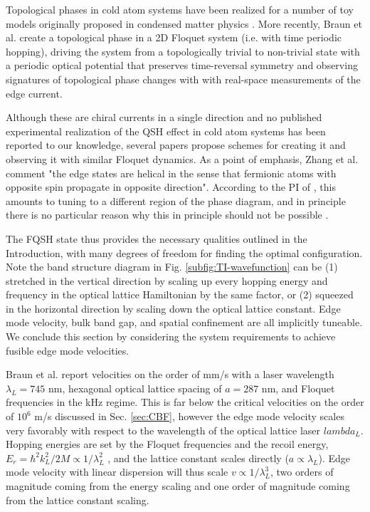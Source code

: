 \documentclass[onecolumn,
               superscriptaddress,
               floatfix,
               longbibliography, 
               showkeys,apl]{revtex4-2}
\begin{document}
Topological phases in cold atom systems have been realized for a number of toy models originally proposed in condensed matter physics \cite{Zhang_2018,Wintersperger_2020}. More recently, Braun et al. \cite{braun2023realspace} create a topological phase in a 2D Floquet system (i.e. with time periodic hopping), driving the system from a topologically trivial to non-trivial state with a periodic optical potential that preserves time-reversal symmetry and observing signatures of topological phase changes with with real-space measurements of the edge current.

Although these are chiral currents in a single direction and no published experimental realization of the QSH effect in cold atom systems has been reported to our knowledge, several papers propose schemes for creating it \cite{PhysRevLett.111.225301,PhysRevA.82.053605,PhysRevLett.109.205303,PhysRevLett.105.255302,Yan2015} and observing it \cite{doi:10.1073/pnas.1300170110} with similar Floquet dynamics. As a point of emphasis, Zhang et al. \cite{Yan2015} comment "the edge states are helical in the sense that fermionic atoms with opposite spin propagate in opposite direction". According to the PI of \cite{braun2023realspace}, this amounts to tuning to a different region of the phase diagram, and in principle there is no particular reason why this in principle should not be possible \cite{AidelsburgerPrivateComm}. 

The FQSH state thus provides the necessary qualities outlined in the Introduction, with many degrees of freedom for finding the optimal configuration. Note the band structure diagram in Fig. \ref{subfig:TI-wavefunction} can be (1) stretched in the vertical direction by scaling up every hopping energy and frequency in the optical lattice Hamiltonian by the same factor, or (2) squeezed in the horizontal direction by scaling down the optical lattice constant. Edge mode velocity, bulk band gap, and spatial confinement are all implicitly tuneable. We conclude this section by considering the system requirements to achieve fusible edge mode velocities.

Braun et al. \cite{braun2023realspace} report velocities on the order of mm/s with a laser wavelength $\lambda_L=745$ nm, hexagonal optical lattice spacing of $a=287$ nm, and Floquet frequencies in the kHz regime. This is far below the critical velocities on the order of $10^6$ m/s discussed in Sec. \ref{sec:CBF}, however the edge mode velocity scales very favorably with respect to the wavelength of the optical lattice laser $lambda_L$. Hopping energies are set by the Floquet frequencies and the recoil energy, $E_r=\hbar^2k_L^2/2M\propto 1/\lambda_L^2$ \cite{Sch_fer_2020}, and the lattice constant scales directly ($a \propto \lambda_L$). Edge mode velocity with linear dispersion will thus scale $v \propto 1/\lambda_L^3$, two orders of magnitude coming from the energy scaling and one order of magnitude coming from the lattice constant scaling.
\end{document}
